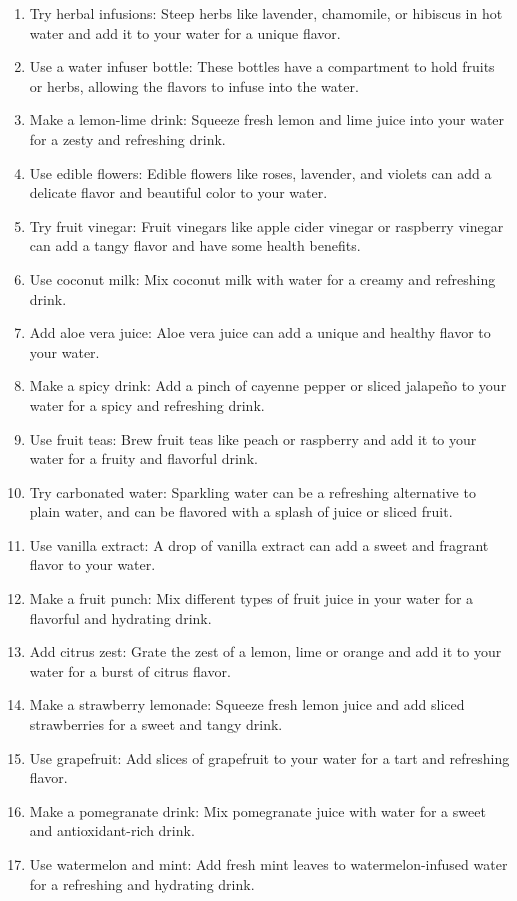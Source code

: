 \begin{enumerate}
\item Try herbal infusions: Steep herbs like lavender, chamomile, or hibiscus in hot water and add it to your water for a unique flavor.
\item Use a water infuser bottle: These bottles have a compartment to hold fruits or herbs, allowing the flavors to infuse into the water.
\item Make a lemon-lime drink: Squeeze fresh lemon and lime juice into your water for a zesty and refreshing drink.
\item Use edible flowers: Edible flowers like roses, lavender, and violets can add a delicate flavor and beautiful color to your water.
\item Try fruit vinegar: Fruit vinegars like apple cider vinegar or raspberry vinegar can add a tangy flavor and have some health benefits.
\item Use coconut milk: Mix coconut milk with water for a creamy and refreshing drink.
\item Add aloe vera juice: Aloe vera juice can add a unique and healthy flavor to your water.
\item Make a spicy drink: Add a pinch of cayenne pepper or sliced jalapeño to your water for a spicy and refreshing drink.
\item Use fruit teas: Brew fruit teas like peach or raspberry and add it to your water for a fruity and flavorful drink.
\item Try carbonated water: Sparkling water can be a refreshing alternative to plain water, and can be flavored with a splash of juice or sliced fruit.
\item Use vanilla extract: A drop of vanilla extract can add a sweet and fragrant flavor to your water.
\item Make a fruit punch: Mix different types of fruit juice in your water for a flavorful and hydrating drink.
\item Add citrus zest: Grate the zest of a lemon, lime or orange and add it to your water for a burst of citrus flavor.
\item Make a strawberry lemonade: Squeeze fresh lemon juice and add sliced strawberries for a sweet and tangy drink.
\item Use grapefruit: Add slices of grapefruit to your water for a tart and refreshing flavor.
\item Make a pomegranate drink: Mix pomegranate juice with water for a sweet and antioxidant-rich drink.
\item Use watermelon and mint: Add fresh mint leaves to watermelon-infused water for a refreshing and hydrating drink.

\end{enumerate}
